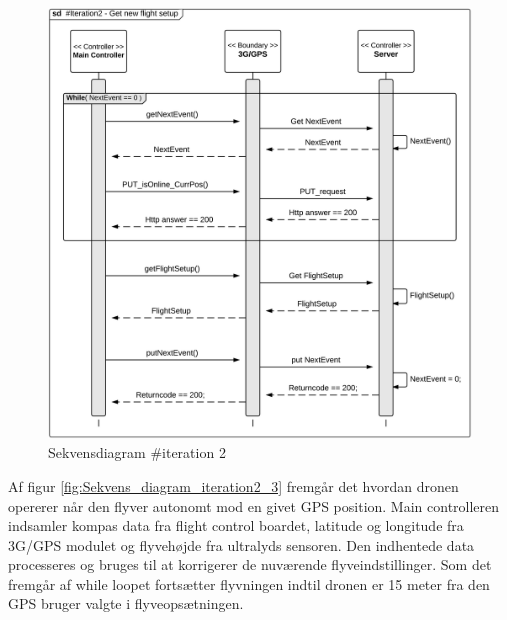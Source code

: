 \begin{figure}[H]
	\centering
	\includegraphics[width=1\textwidth]{Billeder/sekvens/sekvens_iteration2_2}
	\caption{Sekvensdiagram \#iteration 2}
	\label{fig:Sekvens_diagram_iteration2_2}
\end{figure}

\newpage

Af figur \ref{fig:Sekvens_diagram_iteration2_3} fremgår det hvordan dronen opererer når den flyver autonomt mod en givet GPS position. Main controlleren indsamler kompas data fra flight control boardet, latitude og longitude fra 3G/GPS modulet og flyvehøjde fra ultralyds sensoren. Den indhentede data processeres og bruges til at korrigerer de nuværende flyveindstillinger.
Som det fremgår af while loopet fortsætter flyvningen indtil dronen er 15 meter fra den GPS bruger valgte i flyveopsætningen. 


